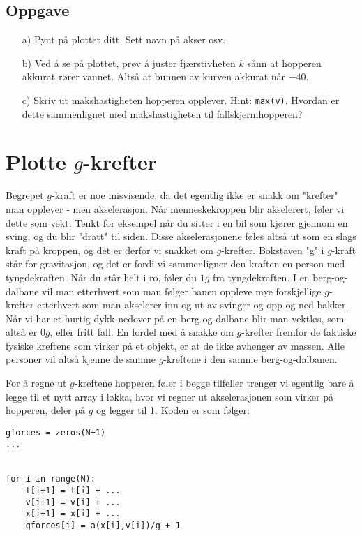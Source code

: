 \documentclass[a4paper, 11pt, notitlepage, english]{article}
\begin{document}
\subsection*{Oppgave}
\begin{itemize}
    \item[a)] Pynt på plottet ditt. Sett navn på akser osv.
    \item[b)] Ved å se på plottet, prøv å juster fjærstivheten $k$ sånn at hopperen akkurat rører vannet. Altså at bunnen av kurven akkurat når $-40.$
    \item[c)] Skriv ut makshastigheten hopperen opplever. Hint: \verb+max(v)+. Hvordan er dette sammenlignet med makshastigheten til fallskjermhopperen?
\end{itemize}

\clearpage

\section*{Plotte $g$-krefter}
Begrepet $g$-kraft er noe misvisende, da det egentlig ikke er snakk om "krefter" man opplever - men akselerasjon. Når menneskekroppen blir akselerert, føler vi dette som vekt. Tenkt for eksempel når du sitter i en bil som kjører gjennom en sving, og du blir "dratt" til siden. Disse akselerasjonene føles altså ut som en slags kraft på kroppen, og det er derfor vi snakket om $g$-krefter. Bokstaven "g" i $g$-kraft står for gravitasjon, og det er fordi vi sammenligner den kraften en person med tyngdekraften. Når du står helt i ro, føler du $1g$ fra tyngdekraften. I en berg-og-dalbane vil man etterhvert som man følger banen oppleve mye forskjellige $g$-krefter etterhvert som man akselerer inn og ut av svinger og opp og ned bakker. Når vi har et hurtig dykk nedover på en berg-og-dalbane blir man vektløs, som altså er $0g$, eller fritt fall. En fordel med å snakke om $g$-krefter fremfor de faktiske fysiske kreftene som virker på et objekt, er at de ikke avhenger av massen. Alle personer vil altså kjenne de samme $g$-kreftene i den samme berg-og-dalbanen.

For å regne ut $g$-kreftene hopperen føler i begge tilfeller trenger vi egentlig bare å legge til et nytt array i løkka, hvor vi regner ut akselerasjonen som virker på hopperen, deler på $g$ og legger til 1. Koden er som følger:
\begin{lstlisting}
gforces = zeros(N+1)
...


for i in range(N):
    t[i+1] = t[i] + ...
    v[i+1] = v[i] + ...
    x[i+1] = x[i] + ...
    gforces[i] = a(x[i],v[i])/g + 1
\end{lstlisting}
\end{document}
